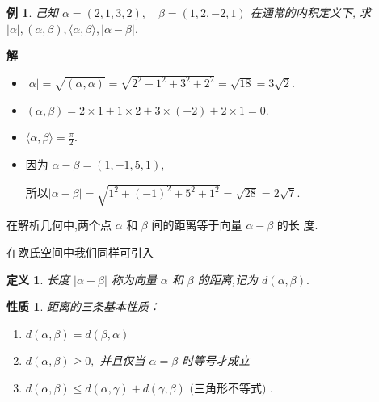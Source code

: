 \documentclass[13pt]{beamer}
\newtheorem{exa}{例}
\newtheorem*{defi}{定义}
\newtheorem*{ex}{练习}
\newtheorem*{prop}{性质}
\def\a{\alpha}
\begin{document}
\begin{frame}
	\begin{exa}己知 $\alpha=(2,1,3,2), \quad \beta=(1,2,-2,1)$
	在通常的内积定义下, 求 $|\alpha|,(\alpha, \beta),\langle\alpha, \beta\rangle,|\alpha-\beta| .$
	\end{exa}
	\pause
{\bf 解~~} 
\begin{itemize}
\item 
$|\alpha|=\sqrt{(\alpha, \alpha)}=\sqrt{2^{2}+1^{2}+3^{2}+2^{2}}=\sqrt{18}=3 \sqrt{2}$.

\item  $(\alpha, \beta)=2 \times 1+1 \times 2+3 \times(-2)+2 \times 1=0$. 

\item   $\langle\alpha, \beta\rangle=\frac{\pi}{2}$.

\item    因为 $\alpha-\beta=(1,-1,5,1)$,

所以$|\alpha-\beta|=\sqrt{1^{2}+(-1)^{2}+5^{2}+1^{2}}=\sqrt{28}=2 \sqrt{7}.$
\end{itemize}
\end{frame}
\begin{frame}

在解析几何中,两个点 $\alpha$ 和 $\beta$ 间的距离等于向量 ${\alpha}-{\beta}$ 的长
度.

在欧氏空间中我们同样可引入 
\begin{defi}
长度 $|{\a}-{\beta} |$ 称为向量 ${\alpha}$ 和 ${\beta}$ 的距离,记为 $d({\alpha}, {\beta}).$
\end{defi}

\begin{prop}
距离的三条基本性质：
\begin{enumerate}
\item  $d({\alpha}, {\beta})=d({\beta}, {\alpha})$
\item  $d({\alpha}, {\beta}) \geqslant 0,$ 并且仅当 ${\a}={\beta}$ 时等号才成立
\item  $d({\alpha}, {\beta}) \leqslant d({\alpha}, {\gamma})+d({\gamma}, {\beta})\text { (三角形不等式) }.$
\end{enumerate}
\end{prop}


\end{frame}
\end{document}
